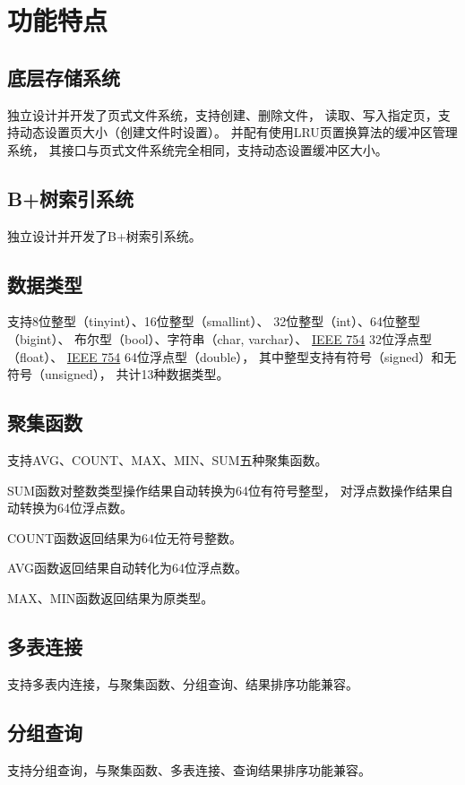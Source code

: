 \section{功能特点}
    \subsection{底层存储系统}
        独立设计并开发了页式文件系统，支持创建、删除文件，%
        读取、写入指定页，支持动态设置页大小（创建文件时设置）。%
        并配有使用LRU页置换算法的缓冲区管理系统，%
        其接口与页式文件系统完全相同，支持动态设置缓冲区大小。
    \subsection{B+树索引系统}
        独立设计并开发了B+树索引系统。
    \subsection{数据类型}
        支持8位整型（tinyint）、16位整型（smallint）、%
        32位整型（int）、64位整型（bigint）、
        布尔型（bool）、字符串（char, varchar）、%
        \href{http://www.eecs.berkeley.edu/~wkahan/ieee754status/IEEE754.PDF}{IEEE 754}%
        32位浮点型（float）、%
        \href{http://www.eecs.berkeley.edu/~wkahan/ieee754status/IEEE754.PDF}{IEEE 754}%
        64位浮点型（double），%
        其中整型支持有符号（signed）和无符号（unsigned），%
        共计13种数据类型。
    \subsection{聚集函数}
        支持AVG、COUNT、MAX、MIN、SUM五种聚集函数。

        SUM函数对整数类型操作结果自动转换为64位有符号整型，%
        对浮点数操作结果自动转换为64位浮点数。

        COUNT函数返回结果为64位无符号整数。

        AVG函数返回结果自动转化为64位浮点数。

        MAX、MIN函数返回结果为原类型。
    \subsection{多表连接}
        支持多表内连接，与聚集函数、分组查询、结果排序功能兼容。
    \subsection{分组查询}
        支持分组查询，与聚集函数、多表连接、查询结果排序功能兼容。
